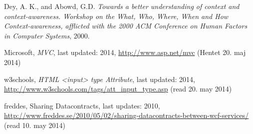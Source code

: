 \documentclass[../report.tex]{subfiles}
\begin{document}
\graphicspath{{img/}{../img/}}
\begingroup
\renewcommand{\chapter}[2]{}%
\begin{thebibliography}{}

  Dey, A. K., and Abowd, G.D.
  \emph{Towards a better understanding of context and context-awareness. Workshop on the What, Who, Where, When and How Context-awareness, afflicted with the 2000 ACM Conference on Human Factors in Computer Systems},
  2000. 

Microsoft, \textit{MVC}, last updated: 2014, \url{http://www.asp.net/mvc} (Hentet  20. maj 2014)

w3schools, \textit{HTML <input> type Attribute}, last updated: 2014,  \url{http://www.w3schools.com/tags/att\_input\_type.asp} (read 20. may 2014)

freddes, Sharing Datacontracts, last updates: 2010, \url{http://www.freddes.se/2010/05/02/sharing-datacontracts-between-wcf-services/} (read 10. may 2014)

\end{thebibliography}
\endgroup
\end{document}

